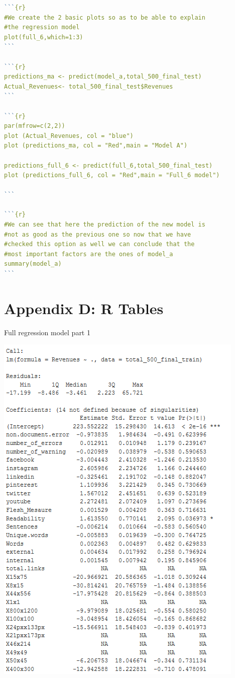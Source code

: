 \documentclass{book}
\begin{document}
\begin{lstlisting}[language=R]
```{r}
#We create the 2 basic plots so as to be able to explain 
#the regression model
plot(full_6,which=1:3)
```

```{r}
predictions_ma <- predict(model_a,total_500_final_test)
Actual_Revenues<- total_500_final_test$Revenues
```

```{r}
par(mfrow=c(2,2))
plot (Actual_Revenues, col = "blue")
plot (predictions_ma, col = "Red",main = "Model A")

predictions_full_6 <- predict(full_6,total_500_final_test)
plot (predictions_full_6, col = "Red",main = "Full_6 model")

```

```{r}
#We can see that here the prediction of the new model is 
#not as good as the previous one so now that we have 
#checked this option as well we can conclude that the 
#most important factors are the ones of model_a
summary(model_a)
```
\end{lstlisting} 


\section{Appendix D: R Tables} \label{appR}
\begin{table}[H]
\centering
\caption{Full regression model part 1}\label{d :r :1a}
\begin{center}
\includegraphics[scale=0.8]{../R/photos/66_FULL_PART1.PNG} \\
\end{center}
\end{table}
\end{document}
